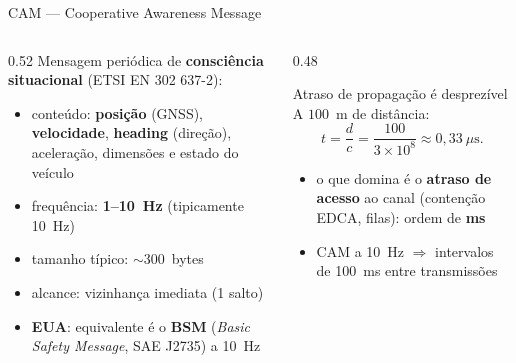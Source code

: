 \documentclass[aspectratio=169,11pt]{beamer}
\begin{document}
\begin{frame}{CAM --- Cooperative Awareness Message}
  \begin{columns}
    \begin{column}{0.52\textwidth}
      Mensagem periódica de \textbf{consciência situacional} (ETSI EN 302 637-2):
      \begin{itemize}
        \item conteúdo: \textbf{posição} (GNSS), \textbf{velocidade}, \textbf{heading} (direção), aceleração, dimensões e estado do veículo
        \item frequência: \textbf{1--10~Hz} (tipicamente 10~Hz)
        \item tamanho típico: $\sim$300~bytes
        \item alcance: vizinhança imediata (1 salto)
        \item \textbf{EUA}: equivalente é o \textbf{BSM} (\emph{Basic Safety Message}, SAE J2735) a 10~Hz
      \end{itemize}
    \end{column}
    \begin{column}{0.48\textwidth}
      \begin{block}{Atraso de propagação é desprezível}
        A $100$~m de distância:
        \[ t = \frac{d}{c} = \frac{100}{3\times10^8} \approx 0{,}33~\mu\text{s}. \]
        \begin{itemize}
          \item o que domina é o \textbf{atraso de acesso} ao canal (contenção EDCA, filas): ordem de \textbf{ms}
          \item CAM a 10~Hz $\Rightarrow$ intervalos de 100~ms entre transmissões
        \end{itemize}
      \end{block}
    \end{column}
  \end{columns}
\end{frame}
\end{document}
